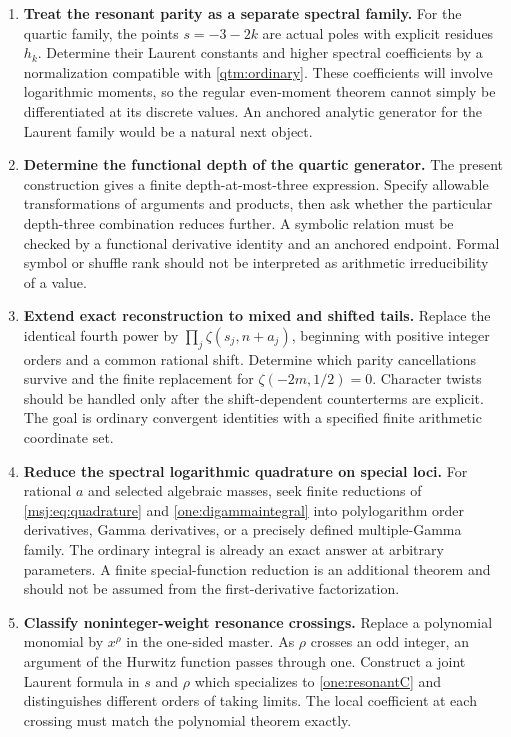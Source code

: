\documentclass[11pt,a4paper]{article}
\numberwithin{equation}{section}
\theoremstyle{plain}
\theoremstyle{definition}
\theoremstyle{remark}
\begin{document}
\begin{enumerate}[leftmargin=*,label=\textbf{R\arabic*.}]
\item \textbf{Treat the resonant parity as a separate spectral family.}
For the quartic family, the points $s=-3-2k$ are actual poles with
explicit residues $h_k$.  Determine their Laurent constants and
higher spectral coefficients by a normalization compatible with
\eqref{qtm:ordinary}.  These coefficients will involve logarithmic
moments, so the regular even-moment theorem cannot simply be
differentiated at its discrete values.  An anchored analytic generator
for the Laurent family would be a natural next object.

\item \textbf{Determine the functional depth of the quartic generator.}
The present construction gives a finite depth-at-most-three expression.
Specify allowable transformations of arguments and products, then ask
whether the particular depth-three combination reduces further.
A symbolic relation must be checked by a functional derivative
identity and an anchored endpoint.  Formal symbol or shuffle rank
should not be interpreted as arithmetic irreducibility of a value.

\item \textbf{Extend exact reconstruction to mixed and shifted tails.}
Replace the identical fourth power by
$\prod_j\zeta(s_j,n+a_j)$, beginning with positive integer orders
and a common rational shift.  Determine which parity cancellations
survive and the finite replacement for
$\zeta(-2m,1/2)=0$.  Character twists should be handled only after
the shift-dependent counterterms are explicit.  The goal is ordinary
convergent identities with a specified finite arithmetic coordinate set.

\item \textbf{Reduce the spectral logarithmic quadrature on special loci.}
For rational $a$ and selected algebraic masses, seek finite reductions
of \eqref{msj:eq:quadrature} and \eqref{one:digammaintegral} into
polylogarithm order derivatives, Gamma derivatives, or a precisely
defined multiple-Gamma family.  The ordinary integral is already an
exact answer at arbitrary parameters.  A finite special-function
reduction is an additional theorem and should not be assumed from
the first-derivative factorization.

\item \textbf{Classify noninteger-weight resonance crossings.}
Replace a polynomial monomial by $x^\rho$ in the one-sided master.
As $\rho$ crosses an odd integer, an argument of the Hurwitz function
passes through one.  Construct a joint Laurent formula in $s$ and
$\rho$ which specializes to \eqref{one:resonantC} and distinguishes
different orders of taking limits.  The local coefficient at each
crossing must match the polynomial theorem exactly.


\end{enumerate}
\end{document}
